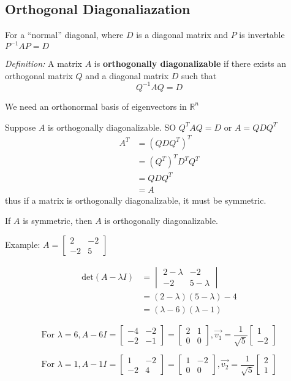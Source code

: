 \documentclass[12pt]{article}
\newcommand{\R}[1]{\mathbb{R}^{#1}}
\newcommand{\vectwo}[2]{\begin{bmatrix}#1\\#2\end{bmatrix}}
\begin{document}
\subsection*{Orthogonal Diagonaliazation}
For a ``normal'' diagonal, where $D$ is a diagonal matrix and $P$ is invertable $P^{-1}AP = D$

\textit{Definition:} A matrix $A$ is {\bf orthogonally diagonalizable} if there exists an orthogonal matrix $Q$ and a diagonal matrix $D$ such that \[ Q^{-1}AQ = D \]

We need an orthonormal basis of eigenvectors in $\R{n}$

Suppose $A$ is orthogonally diagonalizable. SO $Q^TAQ = D$ or $A = QDQ^T$
\begin{align*}
A^T &= (QDQ^T)^T\\
&= (Q^T)^TD^TQ^T\\
&= QDQ^T\\
&= A
\end{align*}
thus if a matrix is orthogonally diagonalizable, it must be symmetric.

\begin{theorem}
If $A$ is symmetric, then $A$ is orthogonally diagonalizable.
\end{theorem}

Example: $A = \begin{bmatrix}2&-2\\-2&5\end{bmatrix}$

\begin{align*}
\text{det}(A-\lambda I) &= \begin{vmatrix}2-\lambda&-2\\-2&5-\lambda\end{vmatrix}\\
&= (2-\lambda)(5-\lambda) - 4\\
&= (\lambda - 6)(\lambda - 1)
\end{align*}

\[ \text{For } \lambda = 6, A-6I = \begin{bmatrix}-4&-2\\-2&-1\end{bmatrix} = \begin{bmatrix}2&1\\0&0\end{bmatrix}, \vec{v_1} = \frac{1}{\sqrt{5}}\vectwo{1}{-2} \]

\[ \text{For } \lambda = 1, A-1I = \begin{bmatrix}1&-2\\-2&4\end{bmatrix} = \begin{bmatrix}1&-2\\0&0\end{bmatrix}, \vec{v_2} = \frac{1}{\sqrt{5}}\vectwo{2}{1} \]
\end{document}
